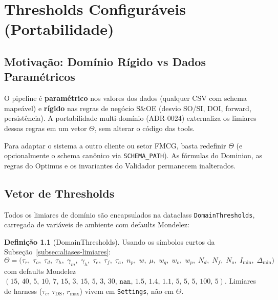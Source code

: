 \documentclass[a4paper, 12pt]{report}
\theoremstyle{definition}
\newtheorem{definicao}{Defini\c{c}\~ao}[chapter]
\theoremstyle{remark}
\begin{document}
\chapter{Thresholds Configur\'aveis (Portabilidade)}

\section{Motiva\c{c}\~ao: Dom\'inio R\'igido vs Dados Param\'etricos}

O pipeline \'e \textbf{param\'etrico} nos valores dos dados (qualquer CSV
com schema mape\'avel) e \textbf{r\'igido} nas regras de neg\'ocio S\&OE
(desvio SO/SI, DOI, forward, persist\^encia). A portabilidade multi-dom\'inio
(ADR-0024) externaliza os limiares dessas regras em um vetor $\Theta$,
sem alterar o c\'odigo das tools.

\begin{caixadecisao}
  Para adaptar o sistema a outro cliente ou setor FMCG, basta
  redefinir $\Theta$ (e opcionalmente o schema can\^onico via
  \texttt{SCHEMA\_PATH}). As f\'ormulas do Dominion, as regras do Optimus
  e os invariantes do Validador permanecem inalterados.
\end{caixadecisao}


\section{Vetor de Thresholds}

Todos os limiares de dom\'inio s\~ao encapsulados na dataclass
\texttt{DomainThresholds}, carregada de vari\'aveis de ambiente
com defaults Mondelez:

\begin{definicao}[DomainThresholds]
  Usando os s\'imbolos curtos da Subse\c{c}\~ao~\ref{subsec:aliases-limiares}:
  \[
    \Theta = \bigl(
      \tau_r,\; \tau_o,\; \tau_d,\; \tau_h,\;
      \gamma_m,\; \gamma_h,\;
      \tau_e,\; \tau_f,\; \tau_a,\;
      n_p,\; w,\; \mu,\;
      w_q,\; w_o,\; w_p,\;
      N_d,\; N_f,\; N_o,\;
      I_{\min},\; \Delta_{\min}
    \bigr)
  \]
  com defaults Mondelez
  $(15,\,40,\,5,\,10,\,7,\,15,\,3,\,15,\,5,\,3,\,30,\,\texttt{nan},\,
  1.5,\,1.4,\,1.1,\,5,\,5,\,5,\,100,\,5)$.
  Limiares de harness ($\tau_c$, $\tau_{\text{DS}}$, $r_{\max}$)
  vivem em \texttt{Settings}, n\~ao em $\Theta$.
\end{definicao}
\end{document}
